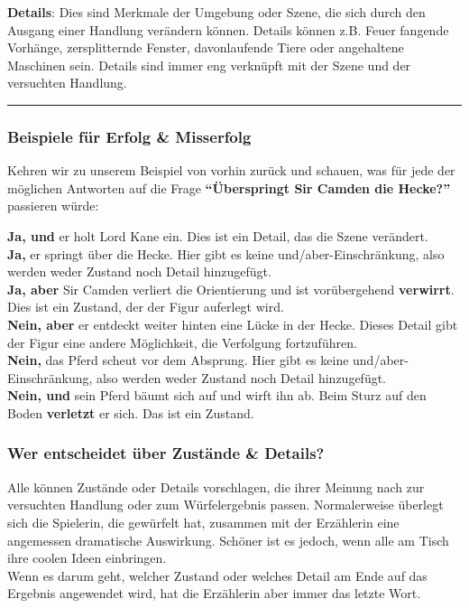 \documentclass[]{article}
\begin{document}
\textbf{Details}: Dies sind Merkmale der Umgebung oder Szene, die sich
durch den Ausgang einer Handlung verändern können. Details können z.B.
Feuer fangende Vorhänge, zersplitternde Fenster, davonlaufende Tiere
oder angehaltene Maschinen sein. Details sind immer eng verknüpft mit
der Szene und der versuchten Handlung.

\begin{center}\rule{0.5\linewidth}{\linethickness}\end{center}

\subsubsection{Beispiele für Erfolg \&
Misserfolg}\label{beispiele-fuxfcr-erfolg-misserfolg}

Kehren wir zu unserem Beispiel von vorhin zurück und schauen, was für
jede der möglichen Antworten auf die Frage \textbf{``Überspringt Sir
Camden die Hecke?''} passieren würde:

\textbf{Ja, und} er holt Lord Kane ein. Dies ist ein Detail, das die
Szene verändert.\\
\textbf{Ja,} er springt über die Hecke. Hier gibt es keine
und/aber-Einschränkung, also werden weder Zustand noch Detail
hinzugefügt.\\
\textbf{Ja, aber} Sir Camden verliert die Orientierung und ist
vorübergehend \textbf{verwirrt}. Dies ist ein Zustand, der der Figur
auferlegt wird.\\
\textbf{Nein, aber} er entdeckt weiter hinten eine Lücke in der Hecke.
Dieses Detail gibt der Figur eine andere Möglichkeit, die Verfolgung
fortzuführen.\\
\textbf{Nein,} das Pferd scheut vor dem Absprung. Hier gibt es keine
und/aber-Einschränkung, also werden weder Zustand noch Detail
hinzugefügt.\\
\textbf{Nein, und} sein Pferd bäumt sich auf und wirft ihn ab. Beim
Sturz auf den Boden \textbf{verletzt} er sich. Das ist ein Zustand.

\subsubsection{Wer entscheidet über Zustände \&
Details?}\label{wer-entscheidet-uxfcber-zustuxe4nde-details}

Alle können Zustände oder Details vorschlagen, die ihrer Meinung nach
zur versuchten Handlung oder zum Würfelergebnis passen. Normalerweise
überlegt sich die Spielerin, die gewürfelt hat, zusammen mit der
Erzählerin eine angemessen dramatische Auswirkung. Schöner ist es
jedoch, wenn alle am Tisch ihre coolen Ideen einbringen.\\
Wenn es darum geht, welcher Zustand oder welches Detail am Ende auf das
Ergebnis angewendet wird, hat die Erzählerin aber immer das letzte Wort.
\end{document}
